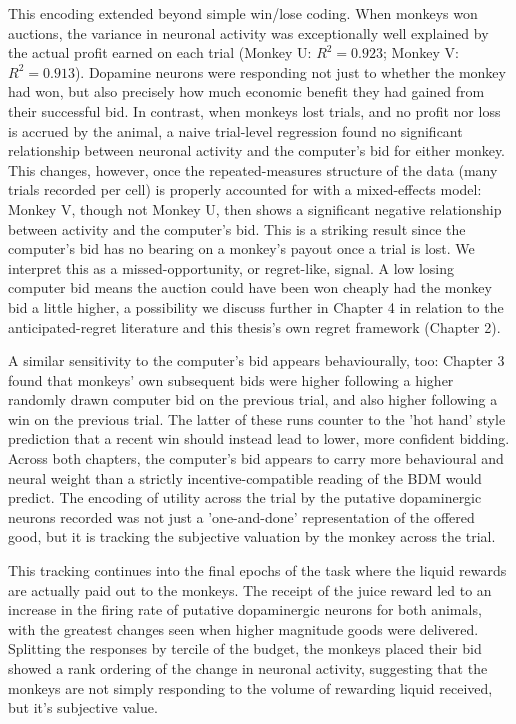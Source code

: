 This encoding extended beyond simple win/lose coding. When monkeys won auctions, the variance in neuronal activity was exceptionally well explained by the actual profit earned on each trial (Monkey U: $R^2 = 0.923$; Monkey V: $R^2 = 0.913$). Dopamine neurons were responding not just to whether the monkey had won, but also precisely how much economic benefit they had gained from their successful bid. In contrast, when monkeys lost trials, and no profit nor loss is accrued by the animal, a naive trial-level regression found no significant relationship between neuronal activity and the computer's bid for either monkey. This changes, however, once the repeated-measures structure of the data (many trials recorded per cell) is properly accounted for with a mixed-effects model: Monkey V, though not Monkey U, then shows a significant negative relationship between activity and the computer's bid. This is a striking result since the computer's bid has no bearing on a monkey's payout once a trial is lost. We interpret this as a missed-opportunity, or regret-like, signal. A low losing computer bid means the auction could have been won cheaply had the monkey bid a little higher, a possibility we discuss further in Chapter 4 in relation to the anticipated-regret literature and this thesis's own regret framework (Chapter 2).

A similar sensitivity to the computer's bid appears behaviourally, too: Chapter 3 found that monkeys' own subsequent bids were higher following a higher randomly drawn computer bid on the previous trial, and also higher following a win on the previous trial. The latter of these runs counter to the 'hot hand' style prediction that a recent win should instead lead to lower, more confident bidding. Across both chapters, the computer's bid appears to carry more behavioural and neural weight than a strictly incentive-compatible reading of the BDM would predict. The encoding of utility across the trial by the putative dopaminergic neurons recorded was not just a 'one-and-done' representation of the offered good, but it is tracking the subjective valuation by the monkey across the trial.

This tracking continues into the final epochs of the task where the liquid rewards are actually paid out to the monkeys. The receipt of the juice reward led to an increase in the firing rate of putative dopaminergic neurons for both animals, with the greatest changes seen when higher magnitude goods were delivered. Splitting the responses by tercile of the budget, the monkeys placed their bid showed a rank ordering of the change in neuronal activity, suggesting that the monkeys are not simply responding to the volume of rewarding liquid received, but it's subjective value.

